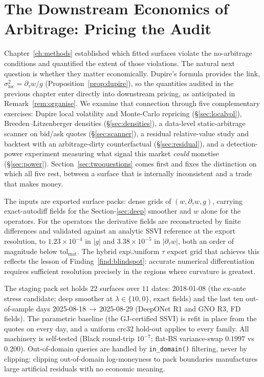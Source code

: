 \chapter{The Downstream Economics of Arbitrage: Pricing the Audit}\label{ch:downstream}

Chapter~\ref{ch:methods} established which fitted surfaces violate the no-arbitrage conditions
and quantified the extent of those violations. The natural next question is whether they matter
economically. Dupire's formula provides the link,
$\sigma_{\mathrm{loc}}^2=\partial_\tau w/g$ (Proposition~\ref{prop:dupire}), so the quantities
audited in the previous chapter enter directly into downstream pricing, as anticipated in
Remark~\ref{rem:organise}. We examine that connection through five complementary exercises:
Dupire local volatility and Monte-Carlo repricing (\S\ref{sec:localvol}),
Breeden--Litzenberger densities (\S\ref{sec:densities}), a data-level static-arbitrage scanner
on bid/ask quotes (\S\ref{sec:scanner}), a residual relative-value study and backtest with an
arbitrage-dirty counterfactual (\S\ref{sec:residual}), and a detection-power experiment
measuring what signal this market \emph{could} monetise (\S\ref{sec:power}).
Section~\ref{sec:twoquestions} comes first and fixes the distinction on which all five rest,
between a surface that is internally inconsistent and a trade that makes money.

The inputs are exported surface packs: dense grids of $(w,\partial_\tau w,g)$, carrying
exact-autodiff fields for the Section-\ref{sec:deep} smoother and $w$ alone for the operators.
For the operators the derivative fields are reconstructed by finite differences and validated
against an analytic SSVI reference at the export resolution, to $1.23\times10^{-4}$ in $|g|$ and
$3.38\times10^{-5}$ in $|\partial_\tau w|$, both an order of magnitude below
$\mathrm{tol}_{\mathrm{mat}}$. The hybrid exp$\cup$uniform $\tau$ export grid that achieves this
reflects the lesson of Finding~\ref{find:blindspot}: accurate numerical differentiation requires
sufficient resolution precisely in the regions where curvature is greatest.

The staging pack set holds $22$ surfaces over $11$ dates: 2018-01-08 (the ex-ante stress
candidate; deep smoother at $\lambda\in\{10,0\}$, exact fields) and the last ten
out-of-sample days 2025-08-18\,$\to$\,2025-08-29 (DeepONet R1 and GNO R3, FD fields). The
parametric baseline (the GJ-certified SSVI) is refit in place from the quotes on every day,
and a uniform $\mathrm{crc32}$ hold-out applies to every family. All machinery is self-tested
(Black round-trip $10^{-7}$; flat-BS variance-swap $0.1997$ vs $0.200$). Out-of-domain
queries are handled by \texttt{in\_domain()} filtering, never by clipping: clipping
out-of-domain log-moneyness to pack boundaries manufactures large artificial residuals with
no economic meaning.

